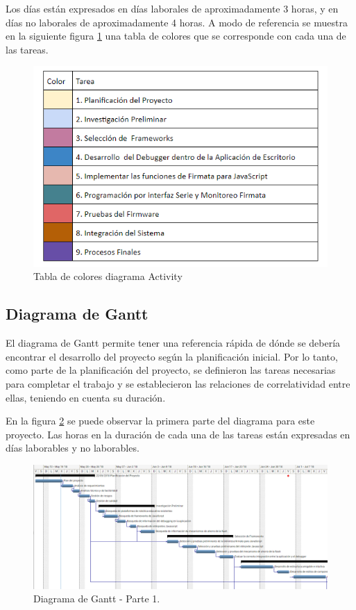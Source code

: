Los días están expresados en días laborales de aproximadamente 3 horas, y en días no laborales de aproximadamente 4 horas. 
A modo de referencia se muestra en la siguiente figura  \ref{fig:tablaColores} una tabla de colores que se corresponde con cada una de las tareas.

\begin{figure}[h]
	\centering
	\includegraphics[scale=.60]{./Figures/tablaColores.png}
	\caption{Tabla de colores diagrama Activity}
	\label{fig:tablaColores}
\end{figure}

\subsection{Diagrama de Gantt}

El diagrama de Gantt permite tener una referencia rápida de dónde se debería encontrar el desarrollo del proyecto según la planificación inicial.
Por lo tanto, como parte de la planificación del proyecto, se definieron las tareas necesarias para completar el trabajo y se establecieron las relaciones de correlatividad entre ellas, teniendo en cuenta su duración. 

En la figura \ref{fig:diagramaGanttPrimeraParte} se puede observar la primera parte del diagrama para este proyecto. Las horas en la duración de cada una de las tareas están expresadas en días laborables y no laborables.

\begin{figure}[h]
	\centering
	\includegraphics[scale=.30]{./Figures/diagramaGanttPrimeraParte.png}
	\caption{Diagrama de Gantt - Parte 1.}
	\label{fig:diagramaGanttPrimeraParte}
\end{figure}

